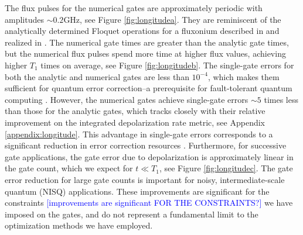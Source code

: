 The flux pulses for the numerical gates
are approximately periodic
with amplitudes $\sim 0.2 \textrm{GHz}$, see Figure \ref{fig:longitudea}.
They are reminiscent of the analytically determined Floquet operations
for a fluxonium described in \cite{huang2020engineering}
and realized in \cite{mundada2020floquet}.
The numerical gate times are greater
than the analytic gate times, but the
numerical flux pulses
spend more time at higher flux values, achieving higher $T_{1}$ times on average,
see Figure \ref{fig:longitudeb}.
The single-gate errors for both the analytic and numerical gates are
less than $10^{-4}$, which makes them sufficient for quantum error correction--a
prerequisite for fault-tolerant quantum
computing \cite{aharonov2008fault, knill2005quantum, gottesman1997stabilizer}.
However, the numerical gates achieve single-gate errors
$\sim 5$ times less than those for the analytic gates,
which tracks closely with their relative improvement
on the integrated depolarization rate metric, see Appendix \ref{appendix:longitude}.
This advantage in single-gate errors corresponds to a
significant reduction in error correction resources
\cite{paetznick2014resource, suchara2013comparing}.
Furthermore, for successive gate applications,
the gate error due to depolarization is approximately linear
in the gate count, which we expect for $t \ll T_{1}$, see Figure \ref{fig:longitudec}.
The gate error reduction for large gate counts is
important for noisy, intermediate-scale quantum (NISQ)
applications. These improvements are significant for the constraints \textcolor{blue}{[improvements are significant FOR THE CONSTRAINTS?]}
we have imposed on the gates,
and do not represent a fundamental limit to the optimization
methods we have employed.

